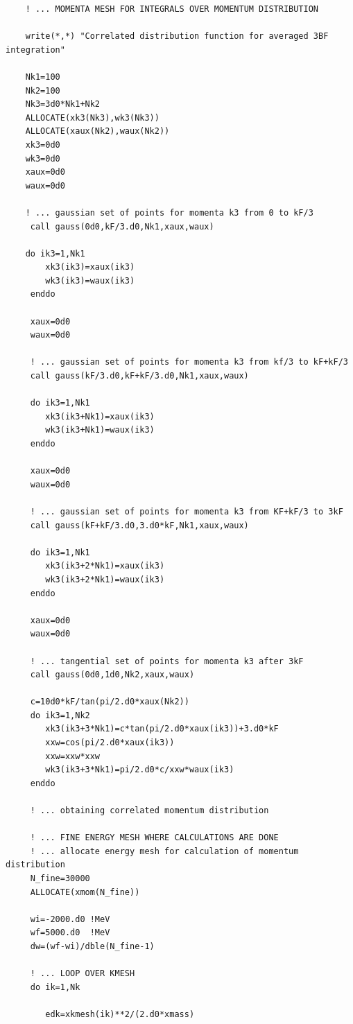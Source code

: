 \vspace*{0.3cm}
\lstset{alsolanguage=[90]Fortran}
\begin{lstlisting}
    ! ... MOMENTA MESH FOR INTEGRALS OVER MOMENTUM DISTRIBUTION 

    write(*,*) "Correlated distribution function for averaged 3BF integration"

    Nk1=100
    Nk2=100
    Nk3=3d0*Nk1+Nk2
    ALLOCATE(xk3(Nk3),wk3(Nk3))
    ALLOCATE(xaux(Nk2),waux(Nk2))
    xk3=0d0
    wk3=0d0
    xaux=0d0 
    waux=0d0
    
    ! ... gaussian set of points for momenta k3 from 0 to kF/3
     call gauss(0d0,kF/3.d0,Nk1,xaux,waux)

    do ik3=1,Nk1
        xk3(ik3)=xaux(ik3)
        wk3(ik3)=waux(ik3)
     enddo

     xaux=0d0
     waux=0d0

     ! ... gaussian set of points for momenta k3 from kf/3 to kF+kF/3
     call gauss(kF/3.d0,kF+kF/3.d0,Nk1,xaux,waux)

     do ik3=1,Nk1
        xk3(ik3+Nk1)=xaux(ik3)
        wk3(ik3+Nk1)=waux(ik3)
     enddo

     xaux=0d0
     waux=0d0

     ! ... gaussian set of points for momenta k3 from KF+kF/3 to 3kF
     call gauss(kF+kF/3.d0,3.d0*kF,Nk1,xaux,waux)

     do ik3=1,Nk1
        xk3(ik3+2*Nk1)=xaux(ik3)
        wk3(ik3+2*Nk1)=waux(ik3)
     enddo

     xaux=0d0
     waux=0d0

     ! ... tangential set of points for momenta k3 after 3kF
     call gauss(0d0,1d0,Nk2,xaux,waux)

     c=10d0*kF/tan(pi/2.d0*xaux(Nk2))
     do ik3=1,Nk2
        xk3(ik3+3*Nk1)=c*tan(pi/2.d0*xaux(ik3))+3.d0*kF
        xxw=cos(pi/2.d0*xaux(ik3))
        xxw=xxw*xxw
        wk3(ik3+3*Nk1)=pi/2.d0*c/xxw*waux(ik3)
     enddo

     ! ... obtaining correlated momentum distribution

     ! ... FINE ENERGY MESH WHERE CALCULATIONS ARE DONE
     ! ... allocate energy mesh for calculation of momentum distribution
     N_fine=30000
     ALLOCATE(xmom(N_fine))
     
     wi=-2000.d0 !MeV
     wf=5000.d0  !MeV
     dw=(wf-wi)/dble(N_fine-1)
        
     ! ... LOOP OVER KMESH        
     do ik=1,Nk
           
        edk=xkmesh(ik)**2/(2.d0*xmass)
           

\end{lstlisting}
